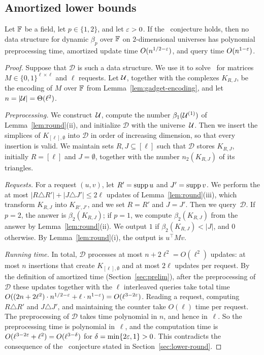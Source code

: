 

\subsection{Amortized lower bounds}\label{sec:lower-amortized}

\begin{theorem}\label{thm:omv}\label{thm:tradeoff}
Let $\mathbb{F}$ be a field, let $p\in\{1,2\}$, and let $\varepsilon>0$.
If the \OMv\ conjecture holds, then no data structure for dynamic $\beta_p$ over $\mathbb{F}$ on $2$-dimensional universes has polynomial preprocessing time, amortized update time $O(n^{1/2-\varepsilon})$, and query time $O(n^{1-\varepsilon})$.
\end{theorem}

\begin{proof}
Suppose that $\mathcal{D}$ is such a data structure.
We use it to solve \OuMv\ for matrices $M\in\{0,1\}^{\ell\times\ell}$ and $\ell$ requests.
Let $\mathcal{U}$, together with the complexes $K_{R,J}$, be the encoding of $M$ over $\mathbb{F}$ from Lemma~\ref{lem:gadget-encoding}, and let $n=|\mathcal{U}|=\Theta(\ell^2)$.

\emph{Preprocessing.}
We construct~$\mathcal{U}$, compute the number $\beta_1(\mathcal{U}^{(1)})$ of Lemma~\ref{lem:round}(ii), and initialize $\mathcal{D}$ with the universe~$\mathcal{U}$.
Then we insert the simplices of $K_{[\ell],\emptyset}$ into $\mathcal{D}$ in order of increasing dimension, so that every insertion is valid.
We maintain sets $R,J\subseteq[\ell]$ such that $\mathcal{D}$ stores $K_{R,J}$, initially $R=[\ell]$ and $J=\emptyset$, together with the number $n_2(K_{R,J})$ of its triangles.

\emph{Requests.}
For a request $(u,v)$, let $R'=\operatorname{supp} u$ and $J'=\operatorname{supp} v$.
We perform the at most $|R\triangle R'|+|J\triangle J'|\le2\ell$ updates of Lemma~\ref{lem:round}(iii), which transform $K_{R,J}$ into $K_{R',J'}$, and we set $R=R'$ and $J=J'$.
Then we query~$\mathcal{D}$.
If $p=2$, the answer is $\beta_2(K_{R,J})$; if $p=1$, we compute $\beta_2(K_{R,J})$ from the answer by Lemma~\ref{lem:round}(ii).
We output $1$ if $\beta_2(K_{R,J})<|J|$, and $0$ otherwise.
By Lemma~\ref{lem:round}(i), the output is $u^{\top}Mv$.

\emph{Running time.}
In total, $\mathcal{D}$ processes at most $n+2\ell^2=O(\ell^2)$ updates: at most $n$ insertions that create $K_{[\ell],\emptyset}$ and at most $2\ell$ updates per request.
By the definition of amortized time (Section~\ref{sec:prelim}), after the preprocessing of~$\mathcal{D}$ these updates together with the $\ell$ interleaved queries take total time $O((2n+2\ell^2)\cdot n^{1/2-\varepsilon}+\ell\cdot n^{1-\varepsilon})=O(\ell^{3-2\varepsilon})$.
Reading a request, computing $R\triangle R'$ and $J\triangle J'$, and maintaining the counter take $O(\ell)$ time per request.
The preprocessing of $\mathcal{D}$ takes time polynomial in $n$, and hence in~$\ell$.
So the preprocessing time is polynomial in~$\ell$, and the computation time is $O(\ell^{3-2\varepsilon}+\ell^2)=O(\ell^{3-\delta})$ for $\delta=\min\{2\varepsilon,1\}>0$.
This contradicts the consequence of the \OMv\ conjecture stated in Section~\ref{sec:lower-round}.


\end{proof}
